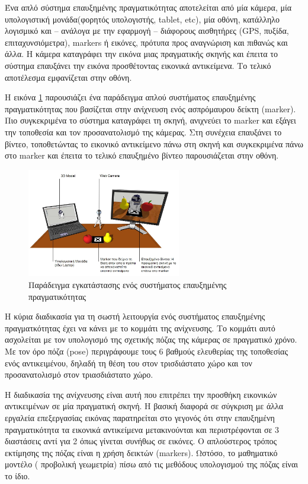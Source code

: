 Ένα απλό σύστημα επαυξημένης πραγματικότητας αποτελείται από μία κάμερα, μία υπολογιστική μονάδα(φορητός υπολογιστής, tablet, etc), μία οθόνη, κατάλληλο λογισμικό και – ανάλογα με την εφαρμογή – διάφορους αισθητήρες (GPS, πυξίδα, επιταχυνσιόμετρα), markers ή εικόνες, πρότυπα προς αναγνώριση και πιθανώς και άλλα. Η κάμερα καταγράφει την εικόνα μιας πραγματικής σκηνής και έπειτα το σύστημα επαυξάνει την εικόνα προσθέτοντας εικονικά αντικείμενα. Το τελικό αποτέλεσμα εμφανίζεται στην οθόνη. 


Η εικόνα \ref{fig:ar_example} παρουσιάζει ένα παράδειγμα απλού συστήματος επαυξημένης πραγματικότητας που βασίζεται στην ανίχνευση ενός ασπρόμαυρου δείκτη (marker). Πιο συγκεκριμένα το σύστημα καταγράφει τη σκηνή, ανιχνεύει το marker και εξάγει την τοποθεσία και τον προσανατολισμό της κάμερας. Στη συνέχεια επαυξάνει το βίντεο, τοποθετώντας το εικονικό αντικείμενο πάνω στη σκηνή και συγκεκριμένα πάνω στο marker και έπειτα το τελικό επαυξημένο βίντεο παρουσιάζεται στην οθόνη.


\begin{figure}[H]
    \centering
    \includegraphics[width=0.6\textwidth]{Files/Figures/ar_system_example.jpg}
    \caption[Παράδειγμα ενός απλού συστήματος επαυξημένης πραγματικότητας ]{ Παράδειγμα εγκατάστασης ενός συστήματος επαυξημένης πραγματικότητας \cite{ar_example}}
    \label{fig:ar_example}
\end{figure}


Η κύρια διαδικασία για τη σωστή λειτουργία ενός συστήματος επαυξημένης πραγματκότητας έχει να κάνει με το κομμάτι της ανίχνευσης. Το κομμάτι αυτό ασχολείται με τον υπολογισμό της σχετικής πόζας της κάμερας σε πραγματικό χρόνο. Με τον όρο πόζα (pose) περιγράφουμε τους 6 βαθμούς ελευθερίας της τοποθεσίας ενός αντικειμένου, δηλαδή τη θέση του στον τρισδιάστατο χώρο και τον προσανατολισμό στον τριασδιάστατο χώρο.

Η διαδικασία της ανίχνευσης είναι αυτή που επιτρέπει την προσθήκη εικονικών αντικειμένων σε μία πραγματική σκηνή.
Η βασική διαφορά σε σύγκριση με άλλα εργαλεία επεξεργασίας εικόνας παρατηρείται στο γεγονός ότι στην επαυξημένη πραγματικότητα τα εικονικά αντικείμενα μετακινούνται και περιστρέφονται σε 3 διαστάσεις αντί για 2 όπως γίνεται συνήθως σε εικόνες.  Ο απλούστερος τρόπος εκτίμησης της πόζας είναι η χρήση δεικτών (markers). 
Ωστόσο, το μαθηματικό μοντέλο ( προβολική γεωμετρία) πίσω από τις μεθόδους υπολογισμού της πόζας είναι το ίδιο. 

